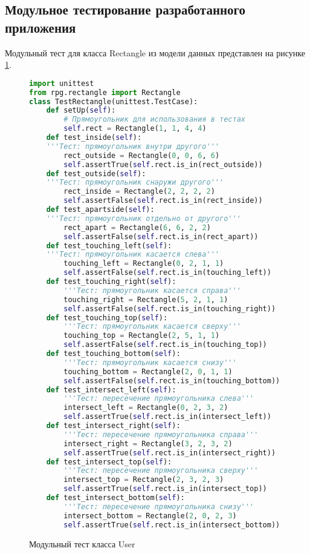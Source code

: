 \subsection{Модульное тестирование разработанного приложения}

Модульный тест для класса Rectangle из модели данных представлен на рисунке \ref{unitUser:image}.

\begin{figure}[H]
\begin{lstlisting}[language=Python]
import unittest
from rpg.rectangle import Rectangle
class TestRectangle(unittest.TestCase):
	def setUp(self):
		# Прямоугольник для использования в тестах
		self.rect = Rectangle(1, 1, 4, 4)
	def test_inside(self):
	'''Тест: прямоугольник внутри другого'''
		rect_outside = Rectangle(0, 0, 6, 6)
		self.assertTrue(self.rect.is_in(rect_outside))
	def test_outside(self):
	'''Тест: прямоугольник снаружи другого'''
		rect_inside = Rectangle(2, 2, 2, 2)
		self.assertFalse(self.rect.is_in(rect_inside))
	def test_apartside(self):
	'''Тест: прямоугольник отдельно от другого'''
		rect_apart = Rectangle(6, 6, 2, 2)
		self.assertFalse(self.rect.is_in(rect_apart))
	def test_touching_left(self):
	'''Тест: прямоугольник касается слева'''
		touching_left = Rectangle(0, 2, 1, 1)
		self.assertFalse(self.rect.is_in(touching_left))
	def test_touching_right(self):
		'''Тест: прямоугольник касается справа'''
		touching_right = Rectangle(5, 2, 1, 1)
		self.assertFalse(self.rect.is_in(touching_right))
	def test_touching_top(self):
		'''Тест: прямоугольник касается сверху'''
		touching_top = Rectangle(2, 5, 1, 1)
		self.assertFalse(self.rect.is_in(touching_top))
	def test_touching_bottom(self):
		'''Тест: прямоугольник касается снизу'''
		touching_bottom = Rectangle(2, 0, 1, 1)
		self.assertFalse(self.rect.is_in(touching_bottom))
	def test_intersect_left(self):
		'''Тест: пересечение прямоугольника слева'''
		intersect_left = Rectangle(0, 2, 3, 2)
		self.assertTrue(self.rect.is_in(intersect_left))
	def test_intersect_right(self):
		'''Тест: пересечение прямоугольника справа'''
		intersect_right = Rectangle(3, 2, 3, 2)
		self.assertTrue(self.rect.is_in(intersect_right))
	def test_intersect_top(self):
		'''Тест: пересечение прямоугольника сверху'''
		intersect_top = Rectangle(2, 3, 2, 3)
		self.assertTrue(self.rect.is_in(intersect_top))
	def test_intersect_bottom(self):
		'''Тест: пересечение прямоугольника снизу'''
		intersect_bottom = Rectangle(2, 0, 2, 3)
		self.assertTrue(self.rect.is_in(intersect_bottom))
\end{lstlisting}  
\caption{Модульный тест класса User}
\label{unitUser:image}
\end{figure}

